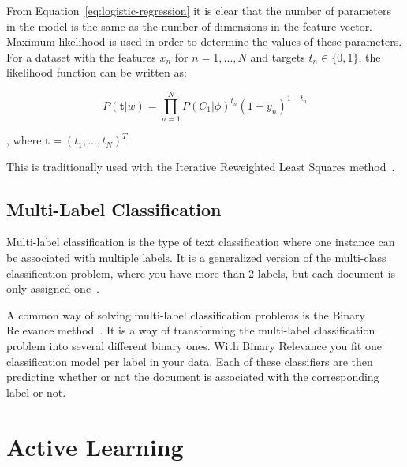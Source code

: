 From Equation~\ref{eq:logistic-regression} it is clear that the number of parameters in the model is the same as the number of dimensions in the feature vector.
Maximum likelihood is used in order to determine the values of these parameters.
For a dataset with the features $x_n$ for $n=1,...,N$ and targets $t_n \in \{0,1\}$, the likelihood function can be written as:

\begin{equation}
    P(\boldsymbol{t}|w) = \prod_{n=1}^N P(C_1|\phi)^{t_n}(1-y_n)^{1-t_n}
\end{equation}

, where $\boldsymbol{t} = (t_1, ..., t_N)^T$.

This is traditionally used with the Iterative Reweighted Least Squares method~\cite{bishop2006pattern}.

\subsection{Multi-Label Classification}\label{subsec:multi-label-classification}

Multi-label classification is the type of text classification where one instance can be associated with multiple labels.
It is a generalized version of the multi-class classification problem, where you have more than 2 labels, but each document is only assigned one~\cite{tsoumakas2006multi}.

A common way of solving multi-label classification problems is the Binary Relevance method~\cite{read2011classifier, boutell2004learning, luaces2012binary}.
It is a way of transforming the multi-label classification problem into several different binary ones.
With Binary Relevance you fit one classification model per label in your data.
Each of these classifiers are then predicting whether or not the document is associated with the corresponding label or not.

\section{Active Learning}\label{sec:active-learning}

